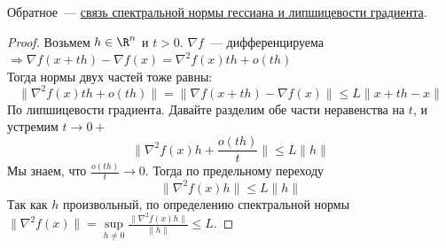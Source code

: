 

\begin{remark}
  Обратное~--- \hyperref[note:4B6D53BA-E599-4DEA-A557-550BD32042BA]{связь спектральной нормы гессиана и липшицевости градиента}.
\end{remark}

\begin{proof}
  Возьмем $h \in \R^n$ и $t > 0$. $\nabla f$~--- дифференцируема $\Rightarrow \nabla f(x + th) - \nabla f(x) = \nabla^2 f(x)th + o(th)$ \\
  Тогда нормы двух частей тоже равны:
  \[
  \|  \nabla^2 f(x)th + o(th) \| = \| \nabla f(x + th) - \nabla f(x) \| \le L \| x + th - x \|
  \]
  По липшицевости градиента.
  Давайте разделим обе части неравенства на $t$, и устремим $t \rightarrow 0+$
  \[
  \|  \nabla^2 f(x)h + \frac{o(th)}{t}  \| \le L \| h \|
  \]
  Мы знаем, что $\frac{o(th)}{t} \rightarrow 0$. Тогда по предельному переходу
  \[
  \|  \nabla^2 f(x)h  \| \le L \| h \|
  \]
  Так как $h$ произвольный, по определению спектральной нормы $\| \nabla^2 f(x) \| = \sup\limits_{h \ne 0} \frac{\| \nabla^2 f(x) h \|}{\| h \|} \le L$.
\end{proof}
